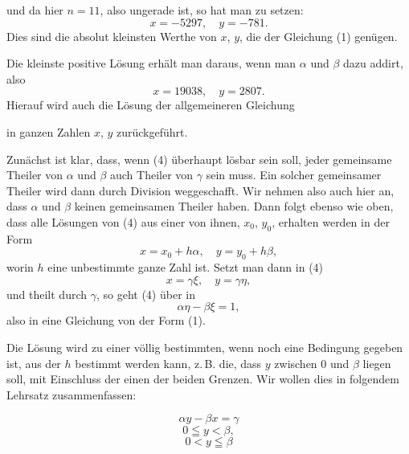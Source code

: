 und da hier $n = 11$, also ungerade ist, so hat man zu setzen:
\[
x = -5297, \quad y = -781.
\]
Dies sind die absolut kleinsten Werthe von $x$, $y$, die der Gleichung (1) genügen.

Die kleinste positive Lösung erhält man daraus, wenn man $\alpha$ und $\beta$ dazu addirt, also
\[
x = 19038, \quad y = 2807.
\]
Hierauf wird auch die Lösung der allgemeineren Gleichung

in ganzen Zahlen $x$, $y$ zurückgeführt.

Zunächst ist klar, dass, wenn (4) überhaupt lösbar sein soll, jeder gemeinsame Theiler von $\alpha$ und $\beta$ auch Theiler von $\gamma$ sein muss. Ein solcher gemeinsamer Theiler wird dann durch Division weggeschafft. Wir nehmen also auch hier an, dass $\alpha$ und $\beta$ keinen gemeinsamen Theiler haben. Dann folgt ebenso wie oben, dass alle Lösungen von (4) aus einer von ihnen, $x_0$, $y_0$, erhalten werden in der Form
\[
x = x_0 + h \alpha, \quad y = y_0 + h \beta,
\]
worin $h$ eine unbestimmte ganze Zahl ist. Setzt man dann in (4)
\[
x = \gamma \xi, \quad y = \gamma \eta,
\]
und theilt durch $\gamma$, so geht (4) über in
\[
\alpha \eta - \beta \xi = 1,
\]
also in eine Gleichung von der Form (1).

Die Lösung wird zu einer völlig bestimmten, wenn noch eine Bedingung gegeben ist, aus der $h$ bestimmt werden kann, z.\,B. die, dass $y$ zwischen $0$ und $\beta$ liegen soll, mit Einschluss der einen der beiden Grenzen. Wir wollen dies in folgendem Lehrsatz zusammenfassen:

\[
\alpha y - \beta x = \gamma
\]
\[
0 \leqq y < \beta,
\]
\[
0 < y \leqq \beta
\]
